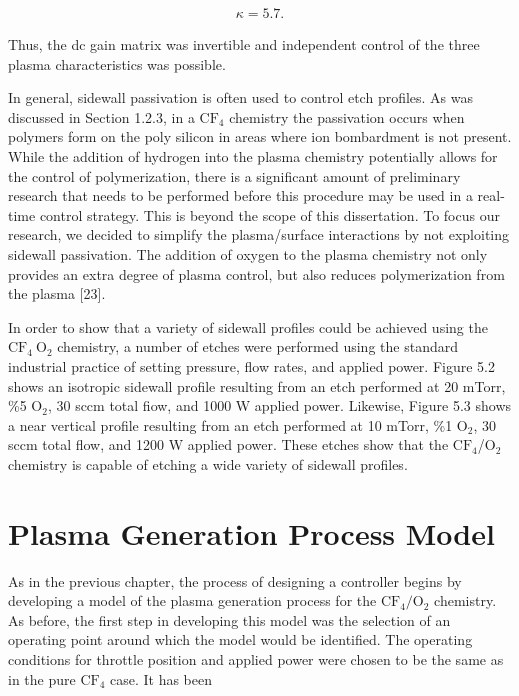 \begin{align}
	\kappa = 5.7.
\end{align}

\noindent Thus, the dc gain matrix was invertible and independent control of the three plasma characteristics was possible.

In general, sidewall passivation is often used to control etch profiles. As was discussed
in Section 1.2.3, in a $\text{CF}_{4}$ chemistry the passivation occurs when polymers form on the poly silicon in areas where ion bombardment is not present. While the addition of hydrogen into the plasma chemistry potentially allows for the control of polymerization, there is a significant amount of preliminary research that needs to be performed before this procedure may be used in a real-time control strategy. This is beyond the scope of this dissertation. To focus our research, we decided to simplify the plasma/surface interactions by not exploiting sidewall passivation. The addition of oxygen to the plasma chemistry not only provides an extra degree of plasma control, but also reduces polymerization from the plasma [23].

In order to show that a variety of sidewall profiles could be achieved using the $\text{CF}_{4}\ \text{O}_{2}$
chemistry, a number of etches were performed using the standard industrial practice of
setting pressure, flow rates, and applied power. Figure 5.2 shows an isotropic sidewall
profile resulting from an etch performed at 20 mTorr, \%5 $\text{O}_{2}$, 30 sccm total fiow, and
1000 W applied power. Likewise, Figure 5.3 shows a near vertical profile resulting from an
etch performed at 10 mTorr, \%1 $\text{O}_{2}$, 30 sccm total flow, and 1200 W applied power. These etches show that the $\text{CF}_{4}$/$\text{O}_{2}$ chemistry is capable of etching a wide variety of sidewall profiles.

\section{Plasma Generation Process Model}
\tab As in the previous chapter, the process of designing a controller begins by developing a
model of the plasma generation process for the $\text{CF}_{4}/\text{O}_{2}$ chemistry. As before, the first step in developing this model was the selection of an operating point around which the model would be identified. The operating conditions for throttle position and applied power were chosen to be the same as in the pure $\text{CF}_{4}$ case. It has been 


